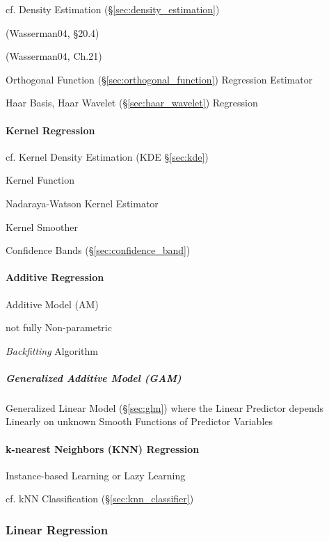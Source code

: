 \fist cf. Density Estimation (\S\ref{sec:density_estimation})

(Wasserman04, \S20.4)

(Wasserman04, Ch.21)

Orthogonal Function (\S\ref{sec:orthogonal_function}) Regression Estimator

Haar Basis, Haar Wavelet (\S\ref{sec:haar_wavelet}) Regression



\paragraph{Kernel Regression}\label{sec:kernel_regression}\hfill

cf. Kernel Density Estimation (KDE \S\ref{sec:kde})

Kernel Function

Nadaraya-Watson Kernel Estimator

Kernel Smoother

Confidence Bands (\S\ref{sec:confidence_band})



\paragraph{Additive Regression}\label{sec:additive_regression}\hfill

Additive Model (AM)

not fully Non-parametric

\emph{Backfitting} Algorithm



\subparagraph{Generalized Additive Model (GAM)}\label{sec:gam}\hfill

Generalized Linear Model (\S\ref{sec:glm}) where the Linear Predictor depends
Linearly on unknown Smooth Functions of Predictor Variables



\paragraph{k-nearest Neighbors (KNN) Regression}\label{sec:knn_regression}

Instance-based Learning or Lazy Learning

cf. kNN Classification (\S\ref{sec:knn_classifier})



\subsubsection{Linear Regression}\label{sec:linear_regression}

